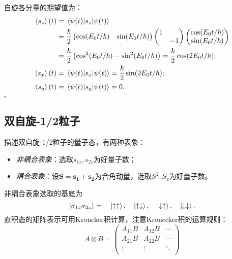 \begin{tcolorbox}[breakable, title={\textbf{例题}}]
    自旋各分量的期望值为：
    \begin{equation}
    \begin{aligned}
        \expval{s_z}(t) &= \mel{\psi(t)}{s_z}{\psi(t)} \\
        &= \frac{\hbar}{2} \begin{pmatrix} \cos(E_0 t/\hbar) & \sin(E_0 t/\hbar) \end{pmatrix} \begin{pmatrix} 1 & \\ & -1 \end{pmatrix} \begin{pmatrix} \cos(E_0 t/\hbar) \\ \sin(E_0 t/\hbar) \end{pmatrix} \\
        &= \frac{\hbar}{2} \left(\cos^2(E_0 t/\hbar) - \sin^2(E_0 t/\hbar)\right)
        = \frac{\hbar}{2} \cos(2E_0 t/\hbar); \\
        \expval{s_x}(t) &= \mel{\psi(t)}{s_x}{\psi(t)} = \frac{\hbar}{2} \sin(2E_0 t/\hbar); \\
        \expval{s_y}(t) &= \mel{\psi(t)}{s_y}{\psi(t)} = 0.
    \end{aligned}
    \end{equation}
    \hfill $\square$
\end{tcolorbox}


\subsection{双自旋-1/2粒子}
\label{subsec:spin_double_particle}

描述双自旋-1/2粒子的量子态，有两种表象：
\begin{itemize}
    \item \emph{非耦合表象}：选取$s_{1z}, s_{2z}$为好量子数；
    \item \emph{耦合表象}：设$\bm{S}=\bm{s_1}+\bm{s_2}$为合角动量，选取$S^2, S_z$为好量子数。
\end{itemize}

非耦合表象选取的基底为
\begin{equation}
    \ket{\sigma_{1z}\sigma_{2z}} =\quad \ket{\uparrow\uparrow}, \quad \ket{\uparrow\downarrow}, \quad \ket{\downarrow\uparrow}, \quad \ket{\downarrow\downarrow}.
\end{equation}
直积态的矩阵表示可用Kroncker积计算，注意Kronecker积的运算规则：
\begin{equation}
    A \otimes B =
    \begin{pmatrix}
        A_{11}B & A_{12}B & \cdots \\
        A_{21}B & A_{22}B & \cdots \\
        \vdots  & \vdots  & \ddots \\
    \end{pmatrix}
\end{equation}

